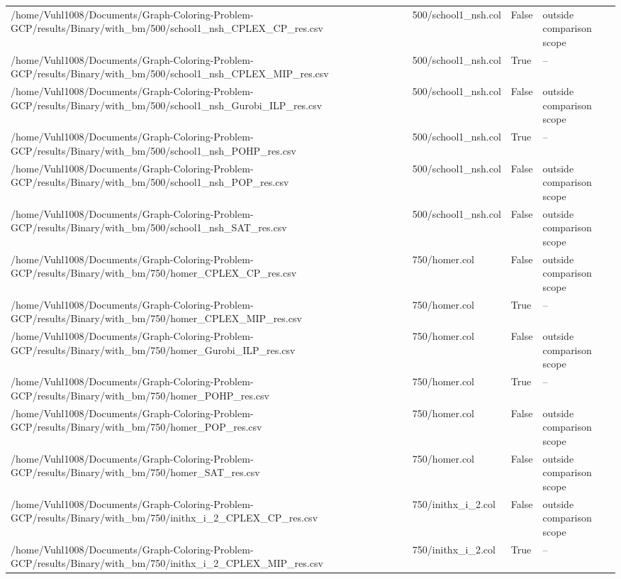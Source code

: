 \begin{table}[htbp]
\begin{tabular}{llll}
/home/Vuhl1008/Documents/Graph-Coloring-Problem-GCP/results/Binary/with\_bm/500/school1\_nsh\_CPLEX\_CP\_res.csv & 500/school1\_nsh.col & False & outside comparison scope \\
/home/Vuhl1008/Documents/Graph-Coloring-Problem-GCP/results/Binary/with\_bm/500/school1\_nsh\_CPLEX\_MIP\_res.csv & 500/school1\_nsh.col & True & -- \\
/home/Vuhl1008/Documents/Graph-Coloring-Problem-GCP/results/Binary/with\_bm/500/school1\_nsh\_Gurobi\_ILP\_res.csv & 500/school1\_nsh.col & False & outside comparison scope \\
/home/Vuhl1008/Documents/Graph-Coloring-Problem-GCP/results/Binary/with\_bm/500/school1\_nsh\_POHP\_res.csv & 500/school1\_nsh.col & True & -- \\
/home/Vuhl1008/Documents/Graph-Coloring-Problem-GCP/results/Binary/with\_bm/500/school1\_nsh\_POP\_res.csv & 500/school1\_nsh.col & False & outside comparison scope \\
/home/Vuhl1008/Documents/Graph-Coloring-Problem-GCP/results/Binary/with\_bm/500/school1\_nsh\_SAT\_res.csv & 500/school1\_nsh.col & False & outside comparison scope \\
/home/Vuhl1008/Documents/Graph-Coloring-Problem-GCP/results/Binary/with\_bm/750/homer\_CPLEX\_CP\_res.csv & 750/homer.col & False & outside comparison scope \\
/home/Vuhl1008/Documents/Graph-Coloring-Problem-GCP/results/Binary/with\_bm/750/homer\_CPLEX\_MIP\_res.csv & 750/homer.col & True & -- \\
/home/Vuhl1008/Documents/Graph-Coloring-Problem-GCP/results/Binary/with\_bm/750/homer\_Gurobi\_ILP\_res.csv & 750/homer.col & False & outside comparison scope \\
/home/Vuhl1008/Documents/Graph-Coloring-Problem-GCP/results/Binary/with\_bm/750/homer\_POHP\_res.csv & 750/homer.col & True & -- \\
/home/Vuhl1008/Documents/Graph-Coloring-Problem-GCP/results/Binary/with\_bm/750/homer\_POP\_res.csv & 750/homer.col & False & outside comparison scope \\
/home/Vuhl1008/Documents/Graph-Coloring-Problem-GCP/results/Binary/with\_bm/750/homer\_SAT\_res.csv & 750/homer.col & False & outside comparison scope \\
/home/Vuhl1008/Documents/Graph-Coloring-Problem-GCP/results/Binary/with\_bm/750/inithx\_i\_2\_CPLEX\_CP\_res.csv & 750/inithx\_i\_2.col & False & outside comparison scope \\
/home/Vuhl1008/Documents/Graph-Coloring-Problem-GCP/results/Binary/with\_bm/750/inithx\_i\_2\_CPLEX\_MIP\_res.csv & 750/inithx\_i\_2.col & True & -- \\

\end{tabular}
\end{table}
